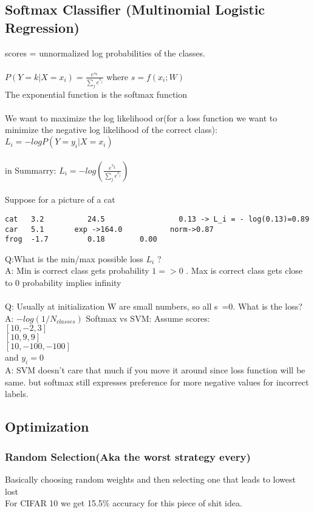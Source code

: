 \documentclass{article}
\begin{document}
\subsection{Softmax Classifier (Multinomial Logistic Regression)}
scores = unnormalized log probabilities of the classes.
\\ \\
$P(Y=k | X= x_i) = \frac{e^{s_k}}{\sum_{j} e^{s_j}}$ where $s = f(x_i; W)$
\\ The exponential function is the softmax function \\
\\ We want to maximize the log likelihood or(for a loss function we want to minimize the negative log likelihood of the correct class):
\\ $L_i = - log P( Y= y_i | X=x_i)$ \\ \\
in Summarry: $L_i = -log(\frac{e^{s_{y_i}}}{\sum_{j} e^{s_j}})$ \\ \\
Suppose for a picture of a cat
\begin{lstlisting}
cat   3.2  	       24.5 	            0.13 -> L_i = - log(0.13)=0.89
car   5.1       exp ->164.0 	      norm->0.87
frog  -1.7	       0.18	   	   0.00
\end{lstlisting}
Q:What is the min/max possible loss ${L_i}$ ?
\\A: Min is correct class gets probability $1 => 0$ . Max is correct class gets close to 0 probability implies infinity \\
\\Q: Usually at initialization W are small numbers, so all s~=0. What is the loss?
\\A: $-log(1/N_{classes})$
Softmax vs SVM:
Assume scores:
\\$[10, -2, 3]$
\\$[10, 9, 9]$
\\$[10, -100, -100]$
\\and $y_i=0$
\\A: SVM doesn't care that much if you move it around since loss function will be same. but softmax still expresses preference for more negative values for incorrect labels.
\subsection{Optimization}
\subsubsection{Random Selection(Aka the worst strategy every)}
Basically choosing random weights and then selecting one that leads to lowest lost
\\ For CIFAR 10 we get 15.5\% accuracy for this piece of shit idea.
\end{document}
